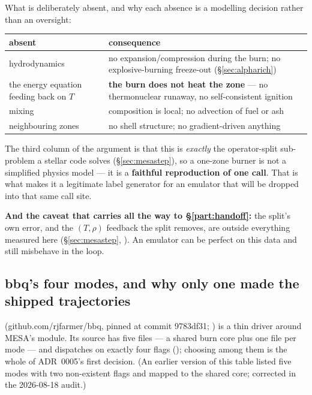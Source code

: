 What is deliberately absent, and why each absence is a modelling decision
rather than an oversight:

\begin{center}
\begin{tabularx}{\textwidth}{@{}L{4.6cm} Y@{}}
\toprule
\textbf{absent} & \textbf{consequence} \\
\midrule
hydrodynamics & no expansion/compression during the burn; no explosive-burning
  freeze-out (\S\ref{sec:alpharich}) \\
the energy equation feeding back on $T$ & \textbf{the burn does not heat the
  zone} --- no thermonuclear runaway, no self-consistent ignition \\
mixing & composition is local; no advection of fuel or ash \\
neighbouring zones & no shell structure; no gradient-driven anything \\
\bottomrule
\end{tabularx}
\end{center}

The third column of the argument is that this is \emph{exactly} the
operator-split sub-problem a stellar code solves (\S\ref{sec:mesastep}), so a
one-zone burner is not a simplified physics model --- it is a \textbf{faithful
reproduction of one call}. That is what makes it a legitimate label generator
for an emulator that will be dropped into that same call site.

\textbf{And the caveat that carries all the way to \S\ref{part:handoff}:} the
split's own error, and the $(T, \rho)$ feedback the split removes, are outside
everything measured here (\S\ref{sec:mesastep}, ). An
emulator can be perfect on this data and still misbehave in the loop.

\subsection{bbq's four modes, and why only one made the shipped trajectories}
\label{sec:bbqmodes}

 (github.com/rjfarmer/bbq, pinned at commit 9783df31; \citealt{bbq}) is a thin
driver around MESA's  module. Its source has five 
files --- a shared burn core  plus one file per mode --- and
 dispatches on exactly four flags
(); choosing among them is the whole of
ADR~0005's first decision. (An earlier version of this table listed five modes
with two non-existent flags and mapped  to the shared
core; corrected in the 2026-08-18 audit.)

